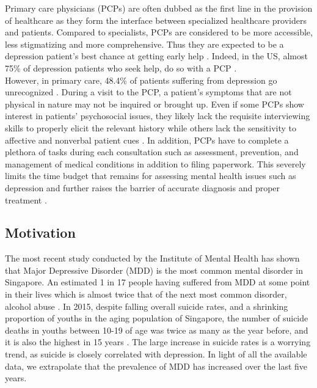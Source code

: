 \documentclass{article}
\begin{document}
    Primary care physicians (PCPs) are often dubbed as the first line in the provision of healthcare as they form the interface between specialized healthcare providers and patients. Compared to specialists, PCPs are considered to be more accessible, less stigmatizing and more comprehensive. Thus they are expected to be a depression patient's best chance at getting early help \cite{rothman2003}. Indeed, in the US, almost 75\% of depression patients who seek help, do so with a PCP \cite{goldman1999}. \\ 

    However, in primary care, 48.4\% of patients suffering from depression go unrecognized \cite{jama2003}. During a visit to the PCP, a patient's symptoms that are not physical in nature may not be inquired or brought up. Even if some PCPs show interest in patients' psychosocial issues, they likely lack the requisite interviewing skills to properly elicit the relevant history while others lack the sensitivity to affective and nonverbal patient cues \cite{badger1994}. In addition, PCPs have to complete a plethora of tasks during each consultation such as assessment, prevention, and management of medical conditions in addition to filing paperwork. This severely limits the time budget that remains for assessing mental health issues such as depression and further raises the barrier of accurate diagnosis and proper treatment \cite{telford2002}. \\

    \subsection{Motivation}
    The most recent study conducted by the Institute of Mental Health has shown that Major Depressive Disorder (MDD) is the most common mental disorder in Singapore. An estimated 1 in 17 people having suffered from MDD at some point in their lives which is almost twice that of the next most common disorder, alcohol abuse \cite{annacadmedsg}. In 2015, despite falling overall suicide rates, and a shrinking proportion of youths in the aging population of Singapore, the number of suicide deaths in youths between 10-19 of age was twice as many as the year before, and it is also the highest in 15 years \cite{samaritansofsingapore2016}. The large increase in suicide rates is a worrying trend, as suicide is closely correlated with depression. In light of all the available data, we extrapolate that the prevalence of MDD has increased over the last five years. \\
\end{document}
